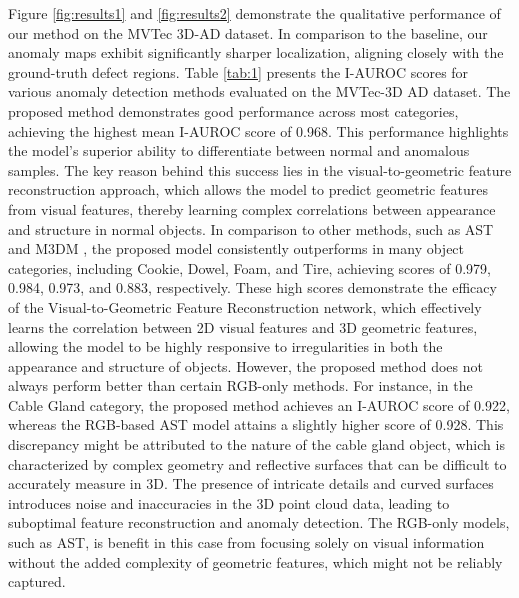 Figure \ref{fig:results1} and \ref{fig:results2} demonstrate the qualitative performance of our method on the MVTec 3D-AD dataset. In comparison to the baseline, our anomaly maps exhibit significantly sharper localization, aligning closely with the ground-truth defect regions. Table \ref{tab:1} presents the I-AUROC scores for various anomaly detection methods evaluated on the MVTec-3D AD dataset. The proposed method demonstrates good performance across most categories, achieving the highest mean I-AUROC score of 0.968. This performance highlights the model's superior ability to differentiate between normal and anomalous samples. The key reason behind this success lies in the visual-to-geometric feature reconstruction approach, which allows the model to predict geometric features from visual features, thereby learning complex correlations between appearance and structure in normal objects. In comparison to other methods, such as AST \cite{rudolph2023asymmetric} and M3DM \cite{wang2023multimodal}, the proposed model consistently outperforms in many object categories, including Cookie, Dowel, Foam, and Tire, achieving scores of 0.979, 0.984, 0.973, and 0.883, respectively. These high scores demonstrate the efficacy of the Visual-to-Geometric Feature Reconstruction network, which effectively learns the correlation between 2D visual features and 3D geometric features, allowing the model to be highly responsive to irregularities in both the appearance and structure of objects. However, the proposed method does not always perform better than certain RGB-only methods. For instance, in the Cable Gland category, the proposed method achieves an I-AUROC score of 0.922, whereas the RGB-based AST model attains a slightly higher score of 0.928. This discrepancy might be attributed to the nature of the cable gland object, which is characterized by complex geometry and reflective surfaces that can be difficult to accurately measure in 3D. The presence of intricate details and curved surfaces introduces noise and inaccuracies in the 3D point cloud data, leading to suboptimal feature reconstruction and anomaly detection. The RGB-only models, such as AST, is benefit in this case from focusing solely on visual information without the added complexity of geometric features, which might not be reliably captured.

